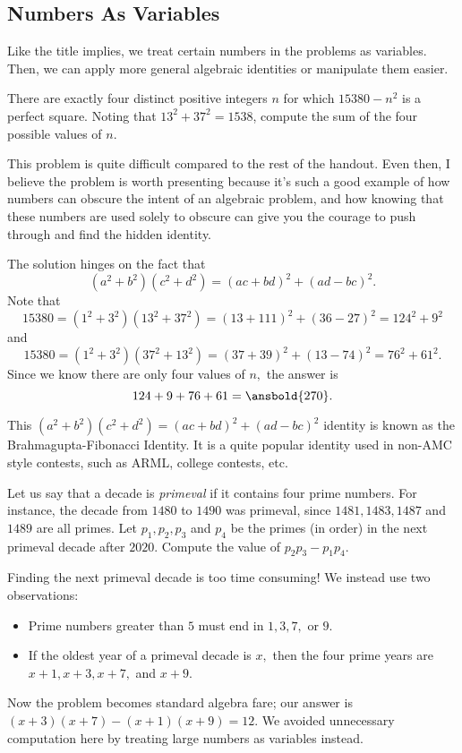 \documentclass[mast]{lucky}
\begin{document}
\subsection{Numbers As Variables}
Like the title implies, we treat certain numbers in the problems as variables. Then, we can apply more general algebraic identities or manipulate them easier.
\begin{exam}[SMT 2021/N5]
There are exactly four distinct positive integers $n$ for which $15380 - n^2$ is a perfect square. Noting that $13^2 + 37^2 = 1538$, compute the sum of the four possible values of $n$.
\end{exam}

This problem is quite difficult compared to the rest of the handout. Even then, I believe the problem is worth presenting because it's such a good example of how numbers can obscure the intent of an algebraic problem, and how knowing that these numbers are used solely to obscure can give you the courage to push through and find the hidden identity.

\begin{sol}
The solution hinges on the fact that
\[(a^2+b^2)(c^2+d^2)=(ac+bd)^2+(ad-bc)^2.\]
Note that
\[15380=(1^2+3^2)(13^2+37^2)=(13+111)^2+(36-27)^2=124^2+9^2\]
and
\[15380=(1^2+3^2)(37^2+13^2)=(37+39)^2+(13-74)^2=76^2+61^2.\]
Since we know there are only four values of $n,$ the answer is
\[124+9+76+61=\ansbold{270}.\]
\end{sol}

This $(a^2+b^2)(c^2+d^2)=(ac+bd)^2+(ad-bc)^2$ identity is known as the Brahmagupta-Fibonacci Identity. It is a quite popular identity used in non-AMC style contests, such as ARML, college contests, etc.

\begin{exam}[2017-2018 Mandelbrot]
Let us say that a decade is \emph{primeval} if it contains four prime numbers. For instance, the decade from $1480$ to $1490$ was primeval, since $1481, 1483, 1487$ and $1489$ are all primes. Let $p_1,p _2, p_3$ and $p_4$ be the primes (in order) in the  next primeval decade after $2020.$ Compute the value of $p_2 p_3-p_1 p_4$.
\end{exam}

\begin{sol}
Finding the next primeval decade is too time consuming! We instead use two observations:
\begin{itemize}
\item Prime numbers greater than $5$ must end in $1,3,7,$ or $9.$
\item If the oldest year of a primeval decade is $x,$ then the four prime years are $x+1,x+3,x+7,$ and $x+9.$
\end{itemize}
Now the problem becomes standard algebra fare; our answer is $(x+3)(x+7)-(x+1)(x+9) = 12.$ We avoided unnecessary computation here by treating large numbers as variables instead.
\end{sol}
\end{document}
